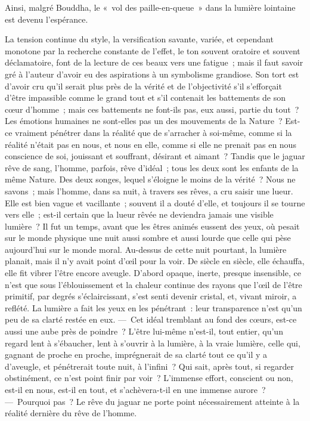 \documentclass[french,twoside]{book} %
\begin{document}
\noindent Ainsi, malgré Bouddha, le « vol des paille-en-queue » dans la lumière lointaine est devenu l’espérance.\par
La tension continue du style, la versification savante, variée, et cependant monotone par la recherche constante de l’effet, le ton souvent oratoire et souvent déclamatoire, font de la lecture de ces beaux vers une fatigue ; mais il faut savoir gré à l’auteur d’avoir eu des aspirations à un symbolisme grandiose. Son tort est d’avoir cru qu’il serait plus près de la vérité et de l’objectivité s’il s’efforçait d’être impassible comme le grand tout et s’il contenait les battements de son cœur d’homme ; mais ces battements ne font-ils pas, eux aussi, partie du tout ? Les émotions humaines ne sont-elles pas un des mouvements de la Nature ? Est-ce vraiment pénétrer dans la réalité que de s’arracher à soi-même, comme si la réalité n’était pas en nous, et nous en elle, comme si elle ne prenait pas en nous conscience de soi, jouissant et souffrant, désirant et aimant ? Tandis que le jaguar rêve de sang, l’homme, parfois, rêve d’idéal ; tous les deux sont les enfants de la même Nature. Des deux songes, lequel s’éloigne le moins de la vérité ? Nous ne savons ; mais l’homme, dans sa nuit, à travers ses rêves, a cru saisir une lueur. Elle est bien vague et vacillante ; souvent il a douté d’elle, et toujours il se tourne vers elle ; est-il certain que la lueur rêvée ne deviendra jamais une visible lumière ? Il fut un temps, avant que les êtres animés eussent des yeux, où pesait sur le monde physique une nuit aussi sombre et aussi lourde que celle qui pèse aujourd’hui sur le monde moral. Au-dessus de cette nuit pourtant, la lumière planait, mais il n’y avait point d’œil pour la voir. De siècle en siècle, elle échauffa, elle fit vibrer l’être encore aveugle. D’abord opaque, inerte, presque insensible, ce n’est que sous l’éblouissement et la chaleur continue des rayons que l’œil de l’être primitif, par degrés s’éclaircissant, s’est senti devenir cristal, et, vivant miroir, a reflété. La lumière a fait les yeux en les pénétrant : leur transparence n’est qu’un peu de sa clarté restée en eux. — Cet idéal tremblant au fond des cœurs, est-ce aussi une aube près de poindre ? L’être lui-même n’est-il, tout entier, qu’un regard lent à s’ébaucher, lent à s’ouvrir à la lumière, à la vraie lumière, celle qui, gagnant de proche en proche, imprégnerait de sa clarté tout ce qu’il y a d’aveugle, et pénétrerait toute nuit, à l’infini ? Qui sait, après tout, si regarder obstinément, ce n’est point finir par voir ? L’immense effort, conscient ou non, est-il en nous, est-il en tout, et s’achèvera-t-il en une immense aurore ? — Pourquoi pas ? Le rêve du jaguar ne porte point nécessairement atteinte à la réalité dernière du rêve de l’homme.
\end{document}
